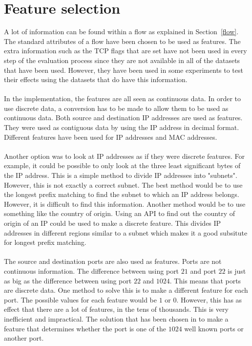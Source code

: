 \section{Feature selection}
\label{featureSelection}
A lot of information can be found within a flow as explained in Section~\ref{flow}. The standard attributes of a flow have been chosen to be used as features. The extra information such as the TCP flags that are set have not been used in every step of the evaluation process since they are not available in all of the datasets that have been used. However, they have been used in some experiments to test their effects using the datasets that do have this information. \\
\\
In the implementation, the features are all seen as continuous data. In order to use discrete data, a conversion has to be made to allow them to be used as continuous data. Both source and destination IP addresses are used as features. They were used as contiguous data by using the IP address in decimal format. Different features have been used for IP addresses and MAC addresses. \\
\\
Another option was to look at IP addresses as if they were discrete features. For example, it could be possible to only look at the three least significant bytes of the IP address. This is a simple method to divide IP addresses into "subnets". However, this is not exactly a correct subnet. The best method would be to use the longest prefix matching to find the subnet to which an IP address belongs. However, it is difficult to find this information. Another method would be to use something like the country of origin. Using an API to find out the country of origin of an IP could be used to make a discrete feature. This divides IP addresses in different regions similar to a subnet which makes it a good subsitute for longest prefix matching.\\
\\
The source and destination ports are also used as features. Ports are not continuous information. The difference between using port $21$ and port $22$ is just as big as the difference between using port $22$ and $1024$. This means that ports are discrete data. One method to solve this is to make a different feature for each port. The possible values for each feature would be $1$ or $0$. However, this has as effect that there are a lot of features, in the tens of thousands. This is very inefficient and impractical. The solution that has been chosen in to make a feature that determines whether the port is one of the $1024$ well known ports or another port. \\

